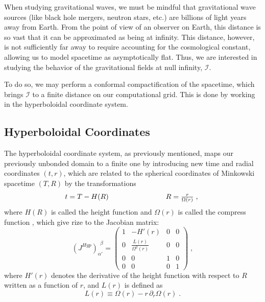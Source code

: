 When studying gravitational waves, we must be mindful that gravitational wave sources (like black hole mergers, neutron stars, etc.) are billions of light years away from Earth. From the point of view of an observer on Earth, this distance is so vast that it can be approximated as being at infinity. This distance, however, is not sufficiently far away to require accounting for the cosmological constant, allowing us to model spacetime as asymptotically flat. Thus, we are interested in studying the behavior of the gravitational fields at null infinity, $\mathscr{I}$.

To do so, we may perform a conformal compactification of the spacetime, which brings $\mathscr{I}$ to a finite distance on our computational grid. This is done by working in the hyperboloidal coordinate system.

\subsection{Hyperboloidal Coordinates}

The hyperboloidal coordinate system, as previously mentioned, maps our previously unbonded domain to a finite one by introducing new time and radial coordinates $(t,r)$, which are related to the spherical coordinates of Minkowski spacetime $(T,R)$ by the transformations
%
\begin{equation}
    \begin{array}{l c r} 
        t = T - H(R) & \qquad\qquad\qquad & R = \frac{r}{\Omega(r)} \; ,
    \end{array} \; 
\end{equation}
%
where $H(R)$ is called the height function and $\Omega(r)$ is called the compress function \cite{hilditch2016evolutionhyperboloidaldatadual,Zengino_lu_2011}, which give rize to the Jacobian matrix:
%
\begin{equation}
    \left(J^{Hyp}\right)_{\alpha'}^{\ \ \beta} = 
    \begin{pmatrix}
        1 & -H'(r) & 0 & 0 \\
        0 & \frac{L(r)}{\Omega^2(r)} & 0 & 0 \\
        0 & 0 & 1 & 0 \\
        0 & 0 & 0 & 1
    \end{pmatrix} \; ,
\end{equation}
%
where $H'(r)$ denotes the derivative of the height function with respect to $R$ written as a function of $r$, and $L(r)$ is defined as
%
\begin{equation}
    L(r) \equiv \Omega(r) - r \, \partial_r \Omega(r) \; .
\end{equation}

